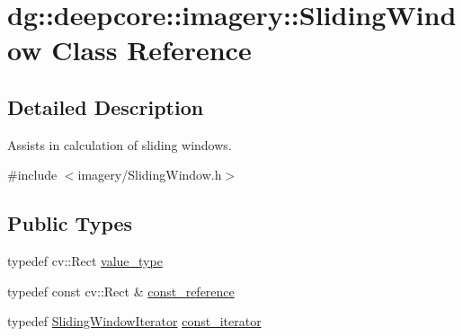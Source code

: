 \hypertarget{classdg_1_1deepcore_1_1imagery_1_1_sliding_window}{}\section{dg\+:\+:deepcore\+:\+:imagery\+:\+:Sliding\+Window Class Reference}
\label{classdg_1_1deepcore_1_1imagery_1_1_sliding_window}


\subsection{Detailed Description}
Assists in calculation of sliding windows. 

{\ttfamily \#include $<$imagery/\+Sliding\+Window.\+h$>$}

\subsection*{Public Types}
\begin{DoxyCompactItemize}
\item 
typedef cv\+::\+Rect \hyperlink{classdg_1_1deepcore_1_1imagery_1_1_sliding_window_aa709c18e431e937e57b72a869e2bf272}{value\+\_\+type}
\item 
typedef const cv\+::\+Rect \& \hyperlink{classdg_1_1deepcore_1_1imagery_1_1_sliding_window_a73353ca1fb994a367f73d6d079b170e9}{const\+\_\+reference}
\item 
typedef \hyperlink{classdg_1_1deepcore_1_1imagery_1_1_sliding_window_iterator}{Sliding\+Window\+Iterator} \hyperlink{classdg_1_1deepcore_1_1imagery_1_1_sliding_window_aca1804ceef890966623a8acfcd01f2e9}{const\+\_\+iterator}
\end{DoxyCompactItemize}
